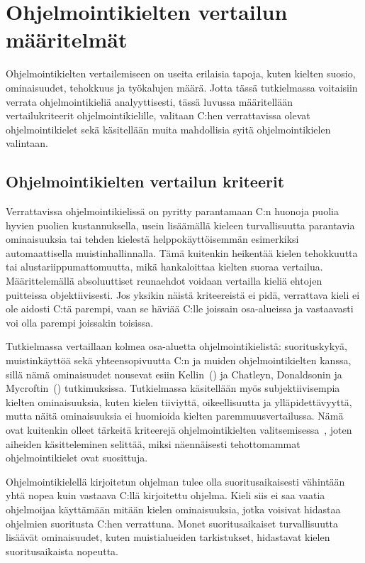 \section{Ohjelmointikielten vertailun määritelmät}

Ohjelmointikielten vertailemiseen on useita erilaisia tapoja, kuten kielten
suosio, ominaisuudet, tehokkuus ja työkalujen määrä. Jotta tässä tutkielmassa
voitaisiin verrata ohjelmointikieliä analyyttisesti, tässä luvussa määritellään
vertailukriteerit ohjelmointikielille, valitaan C:hen verrattavissa olevat
ohjelmointikielet sekä käsitellään muita mahdollisia syitä ohjelmointikielen
valintaan.

\subsection{Ohjelmointikielten vertailun kriteerit}
\label{sec:abs}

Verrattavissa ohjelmointikielissä on pyritty parantamaan C:n huonoja puolia
hyvien puolien kustannuksella, usein lisäämällä kieleen turvallisuutta
parantavia ominaisuuksia tai tehden kielestä helppokäyttöisemmän esimerkiksi
automaattisella muistinhallinnalla. Tämä kuitenkin heikentää kielen tehokkuutta
tai alustariippumattomuutta, mikä hankaloittaa kielten suoraa vertailua.
Määrittelemällä absoluuttiset reunaehdot voidaan vertailla kieliä ehtojen
puitteissa objektiivisesti. Jos yksikin näistä kriteereistä ei pidä, verrattava
kieli ei ole aidosti C:tä parempi, vaan se häviää C:lle joissain osa-alueissa
ja vastaavasti voi olla parempi joissakin toisissa.

Tutkielmassa vertaillaan kolmea osa-aluetta ohjelmointikielistä: suorituskykyä,
muistinkäyttöä sekä yhteensopivuutta C:n ja muiden ohjelmointikielten kanssa,
sillä nämä ominaisuudet nousevat esiin Kellin~(\citeyear{somemeantforc}) ja
Chatleyn, Donaldsonin ja Mycroftin~(\citeyear{next7000}) tutkimuksissa.
Tutkielmassa käsitellään myös subjektiivisempia kielten ominaisuuksia, kuten
kielen tiiviyttä, oikeellisuutta ja ylläpidettävyyttä, mutta näitä
ominaisuuksia ei huomioida kielten paremmuusvertailussa. Nämä ovat kuitenkin
olleet tärkeitä kriteerejä ohjelmointikielten
valitsemisessa~\citep{empiricalpopularity}, joten aiheiden käsitteleminen
selittää, miksi näennäisesti tehottomammat ohjelmointikielet ovat suosittuja.

Ohjelmointikielellä kirjoitetun ohjelman tulee olla suoritusaikaisesti
vähintään yhtä nopea kuin vastaava C:llä kirjoitettu ohjelma. Kieli siis ei saa
vaatia ohjelmoijaa käyttämään mitään kielen ominaisuuksia, jotka voisivat
hidastaa ohjelmien suoritusta C:hen verrattuna. Monet suoritusaikaiset
turvallisuutta lisäävät ominaisuudet, kuten muistialueiden tarkistukset,
hidastavat kielen suoritusaikaista nopeutta.

